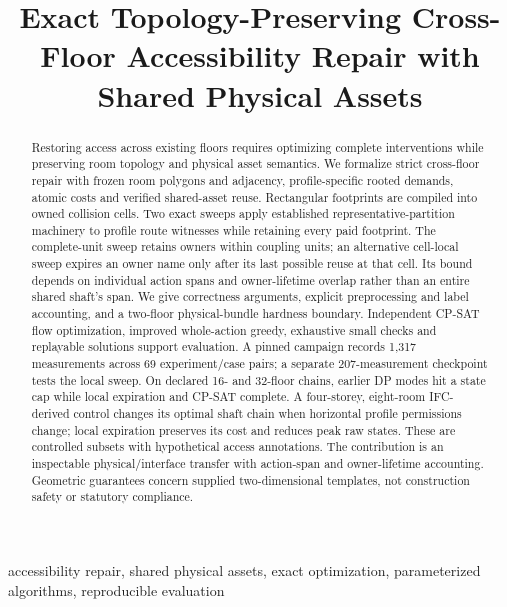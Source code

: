 \documentclass[conference]{IEEEtran}
\title{Exact Topology-Preserving Cross-Floor Accessibility Repair with Shared Physical Assets}
\author{}
\begin{document}
\maketitle
\begin{abstract}
Restoring access across existing floors requires optimizing complete interventions while preserving room topology and physical asset semantics. We formalize strict cross-floor repair with frozen room polygons and adjacency, profile-specific rooted demands, atomic costs and verified shared-asset reuse. Rectangular footprints are compiled into owned collision cells. Two exact sweeps apply established representative-partition machinery to profile route witnesses while retaining every paid footprint. The complete-unit sweep retains owners within coupling units; an alternative cell-local sweep expires an owner name only after its last possible reuse at that cell. Its bound depends on individual action spans and owner-lifetime overlap rather than an entire shared shaft's span. We give correctness arguments, explicit preprocessing and label accounting, and a two-floor physical-bundle hardness boundary. Independent CP-SAT flow optimization, improved whole-action greedy, exhaustive small checks and replayable solutions support evaluation. A pinned campaign records 1,317 measurements across 69 experiment/case pairs; a separate 207-measurement checkpoint tests the local sweep. On declared 16- and 32-floor chains, earlier DP modes hit a state cap while local expiration and CP-SAT complete. A four-storey, eight-room IFC-derived control changes its optimal shaft chain when horizontal profile permissions change; local expiration preserves its cost and reduces peak raw states. These are controlled subsets with hypothetical access annotations. The contribution is an inspectable physical/interface transfer with action-span and owner-lifetime accounting. Geometric guarantees concern supplied two-dimensional templates, not construction safety or statutory compliance.
\end{abstract}
\begin{IEEEkeywords}
accessibility repair, shared physical assets, exact optimization, parameterized algorithms, reproducible evaluation
\end{IEEEkeywords}
\end{document}
